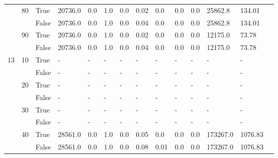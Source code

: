 \begin{appendices}
\begin{landscape}
\begin{small}
\begin{longtable}[c]{@{}lll|ll|ll|ll|ll|lll@{}}
   & 80 & True  & 20736.0         & 0.0            & 1.0           & 0.0           & 0.02          & 0.0           & 0.0           & 0.0           & 25862.8       & 134.01      &  \\
   &    & False & 20736.0         & 0.0            & 1.0           & 0.0           & 0.04          & 0.0           & 0.0           & 0.0           & 25862.8       & 134.01      &  \\
   & 90 & True  & 20736.0         & 0.0            & 1.0           & 0.0           & 0.02          & 0.0           & 0.0           & 0.0           & 12175.0       & 73.78       &  \\
   &    & False & 20736.0         & 0.0            & 1.0           & 0.0           & 0.04          & 0.0           & 0.0           & 0.0           & 12175.0       & 73.78       &  \\
  \midrule
13 & 10 & True  & -               & -              & -             & -             & -             & -             & -             & -             & -             & -           &  \\
   &    & False & -               & -              & -             & -             & -             & -             & -             & -             & -             & -           &  \\
   & 20 & True  & -               & -              & -             & -             & -             & -             & -             & -             & -             & -           &  \\
   &    & False & -               & -              & -             & -             & -             & -             & -             & -             & -             & -           &  \\
   & 30 & True  & -               & -              & -             & -             & -             & -             & -             & -             & -             & -           &  \\
   &    & False & -               & -              & -             & -             & -             & -             & -             & -             & -             & -           &  \\
   & 40 & True  & 28561.0         & 0.0            & 1.0           & 0.0           & 0.05          & 0.0           & 0.0           & 0.0           & 173267.0      & 1076.83     &  \\
   &    & False & 28561.0         & 0.0            & 1.0           & 0.0           & 0.08          & 0.01          & 0.0           & 0.0           & 173267.0      & 1076.83     &  \\

\end{longtable}
\end{small}
\end{landscape}
\end{appendices}
